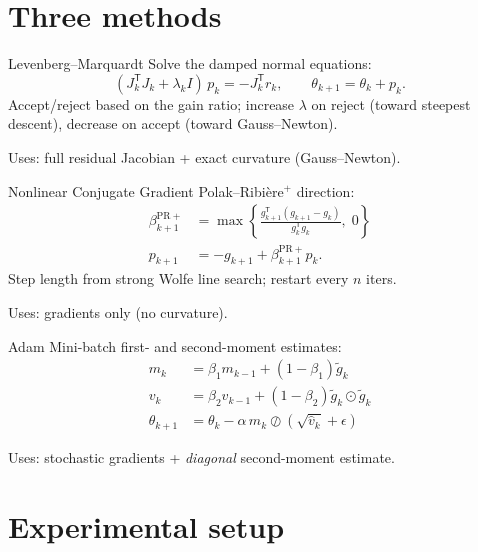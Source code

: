 \documentclass[10pt,aspectratio=169]{beamer}
\newcommand{\T}{^{\mathsf{T}}}
\begin{document}
\section{Three methods}

\begin{frame}{Levenberg--Marquardt}
  Solve the damped normal equations:
  \begin{equation*}
    (J_k\T J_k + \lambda_k I)\, p_k = -J_k\T r_k,
    \qquad \theta_{k+1} = \theta_k + p_k.
  \end{equation*}
  Accept/reject based on the gain ratio; increase $\lambda$ on reject
  (toward steepest descent), decrease on accept (toward Gauss--Newton).
  \vspace{1em}

  Uses: full residual Jacobian + exact curvature (Gauss--Newton).
\end{frame}

\begin{frame}{Nonlinear Conjugate Gradient}
  Polak--Ribi\`ere${}^+$ direction:
  \begin{align*}
    \beta_{k+1}^{\mathrm{PR+}}
    &= \max\!\left\{\frac{g_{k+1}\T(g_{k+1}-g_k)}{g_k\T g_k},\; 0\right\} \\
    p_{k+1} &= -g_{k+1} + \beta_{k+1}^{\mathrm{PR+}} p_k.
  \end{align*}
  Step length from strong Wolfe line search; restart every $n$ iters.
  \vspace{1em}

  Uses: gradients only (no curvature).
\end{frame}

\begin{frame}{Adam}
  Mini-batch first- and second-moment estimates:
  \begin{align*}
    m_k &= \beta_1 m_{k-1} + (1-\beta_1) \tilde{g}_k \\
    v_k &= \beta_2 v_{k-1} + (1-\beta_2) \tilde{g}_k \odot \tilde{g}_k \\
    \theta_{k+1} &= \theta_k - \alpha\, \hat{m}_k \oslash (\sqrt{\hat{v}_k} + \epsilon)
  \end{align*}

  Uses: stochastic gradients + \emph{diagonal} second-moment estimate.
\end{frame}

\section{Experimental setup}
\end{document}
